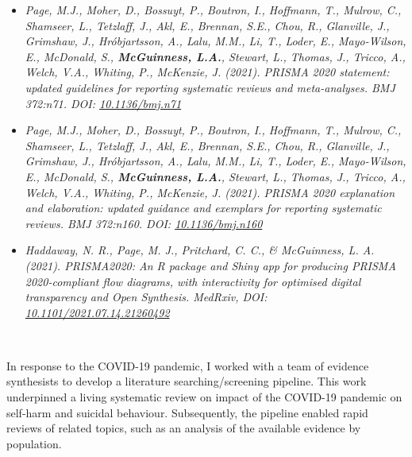 \documentclass[a4paper, twoside]{templates/ociamthesis}
\begin{document}
\begin{itemize}
\item
  \emph{Page, M.J., Moher, D., Bossuyt, P., Boutron, I., Hoffmann, T., Mulrow, C., Shamseer, L., Tetzlaff, J., Akl, E., Brennan, S.E., Chou, R., Glanville, J., Grimshaw, J., Hróbjartsson, A., Lalu, M.M., Li, T., Loder, E., Mayo-Wilson, E., McDonald, S., \textbf{McGuinness, L.A.}, Stewart, L., Thomas, J., Tricco, A., Welch, V.A., Whiting, P., McKenzie, J. (2021). PRISMA 2020 statement: updated guidelines for reporting systematic reviews and meta-analyses. BMJ 372:n71. DOI: \href{https://doi.org/10.1136/bmj.n71}{10.1136/bmj.n71}}
\item
  \emph{Page, M.J., Moher, D., Bossuyt, P., Boutron, I., Hoffmann, T., Mulrow, C., Shamseer, L., Tetzlaff, J., Akl, E., Brennan, S.E., Chou, R., Glanville, J., Grimshaw, J., Hróbjartsson, A., Lalu, M.M., Li, T., Loder, E., Mayo-Wilson, E., McDonald, S., \textbf{McGuinness, L.A.}, Stewart, L., Thomas, J., Tricco, A., Welch, V.A., Whiting, P., McKenzie, J. (2021). PRISMA 2020 explanation and elaboration: updated guidance and exemplars for reporting systematic reviews. BMJ 372:n160. DOI: \href{https://doi.org/10.1136/bmj.n160}{10.1136/bmj.n160}}
\item
  \emph{Haddaway, N. R., Page, M. J., Pritchard, C. C., \& McGuinness, L. A. (2021). PRISMA2020: An R package and Shiny app for producing PRISMA 2020-compliant flow diagrams, with interactivity for optimised digital transparency and Open Synthesis. MedRxiv, DOI: \href{https://doi.org/10.1101/2021.07.14.21260492}{10.1101/2021.07.14.21260492}}
\end{itemize}

~

In response to the COVID-19 pandemic, I worked with a team of evidence synthesists to develop a literature searching/screening pipeline. This work underpinned a living systematic review on impact of the COVID-19 pandemic on self-harm and suicidal behaviour. Subsequently, the pipeline enabled rapid reviews of related topics, such as an analysis of the available evidence by population.
\end{document}
